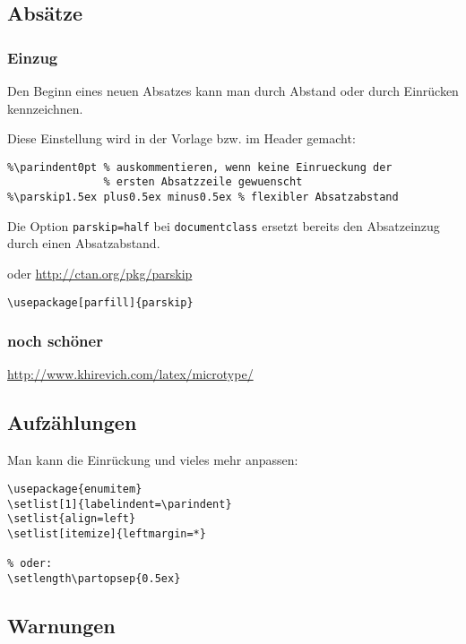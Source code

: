 \subsection{Absätze}\label{absuxe4tze}

\subsubsection{Einzug}\label{einzug}

Den Beginn eines neuen Absatzes kann man durch Abstand oder durch
Einrücken kennzeichnen.

Diese Einstellung wird in der Vorlage bzw. im Header gemacht:

\begin{lstlisting}
%\parindent0pt % auskommentieren, wenn keine Einrueckung der 
               % ersten Absatzzeile gewuenscht
%\parskip1.5ex plus0.5ex minus0.5ex % flexibler Absatzabstand
\end{lstlisting}

Die Option \lstinline!parskip=half! bei \lstinline!documentclass!
ersetzt bereits den Absatzeinzug durch einen Absatzabstand.

oder \url{http://ctan.org/pkg/parskip}

\begin{lstlisting}
\usepackage[parfill]{parskip}
\end{lstlisting}

\subsubsection{noch schöner}\label{noch-schuxf6ner}

\url{http://www.khirevich.com/latex/microtype/}

\subsection{Aufzählungen}\label{aufzuxe4hlungen}

Man kann die Einrückung und vieles mehr anpassen:

\begin{lstlisting}
\usepackage{enumitem}
\setlist[1]{labelindent=\parindent}
\setlist{align=left}
\setlist[itemize]{leftmargin=*}

% oder: 
\setlength\partopsep{0.5ex}
\end{lstlisting}

\subsection{Warnungen}\label{warnungen}

